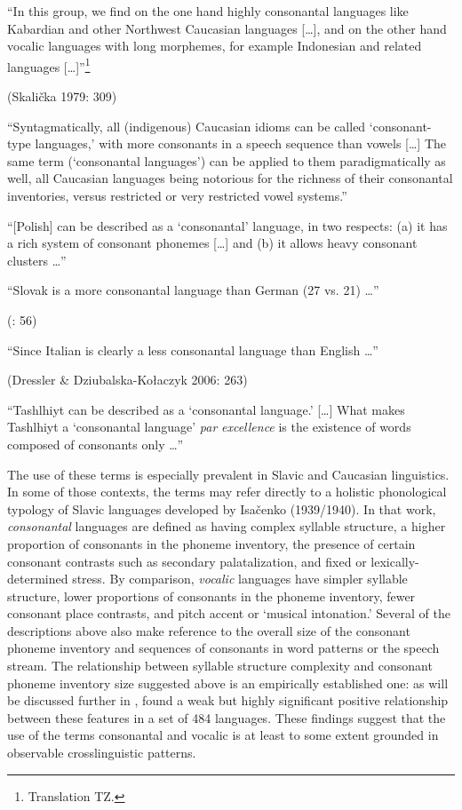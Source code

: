 \ea\label{ex:(1.13)}
   “In this group, we find on the one hand highly consonantal languages like Kabardian and other Northwest Caucasian languages […], and on the other hand vocalic languages with long morphemes, for example Indonesian and related languages […]”\footnote{ \textrm{Translation TZ.}}

(Skalička 1979: 309)
\z

\ea\label{ex:(1.14)}
   “Syntagmatically, all (indigenous) Caucasian idioms can be called ‘consonant-type languages,’ with more consonants in a speech sequence than vowels […] The same term (‘consonantal languages’) can be applied to them paradigmatically as well, all Caucasian languages being notorious for the richness of their consonantal inventories, versus restricted or very restricted vowel systems.” 

\citep[43]{Chirikba2008}
\z

\ea\label{ex:(1.15)}
  “[Polish] can be described as a ‘consonantal’ language, in two respects: (a) it has a rich system of consonant phonemes […] and (b) it allows heavy consonant clusters …” 

\citep[103]{Jassem2003}
\z

\ea\label{ex:(1.16)}
   “Slovak is a more consonantal language than German (27 vs. 21) …”

(\citealt{DresslerEtAl2015}: 56)
\z

\ea\label{ex:(1.17)}
  “Since Italian is clearly a less consonantal language than English …” 

(Dressler \& Dziubalska-Kołaczyk 2006: 263)
\z

\ea\label{ex:(1.18)}
  “Tashlhiyt can be described as a ‘consonantal language.’ […] What makes Tashlhiyt a ‘consonantal language’ \textit{par} \textit{excellence} is the existence of words composed of consonants only …” 
\z

\citep[216]{Ridouane2014}

  The use of these terms is especially prevalent in Slavic and Caucasian linguistics. In some of those contexts, the terms may refer directly to a holistic phonological typology of Slavic languages developed by Isačenko (1939/1940). In that work, \textit{consonantal} languages are defined as having complex syllable structure, a higher proportion of consonants in the phoneme inventory, the presence of certain consonant contrasts such as secondary palatalization, and fixed or lexically-determined stress. By comparison, \textit{vocalic} languages have simpler syllable structure, lower proportions of consonants in the phoneme inventory, fewer consonant place contrasts, and pitch accent or ‘musical intonation.’ Several of the descriptions above also make reference to the overall size of the consonant phoneme inventory and sequences of consonants in word patterns or the speech stream. The relationship between syllable structure complexity and consonant phoneme inventory size suggested above is an empirically established one: as will be discussed further in , \citet{Maddieson2013a} found a weak but highly significant positive relationship between these features in a set of 484 languages. These findings suggest that the use of the terms consonantal and vocalic is at least to some extent grounded in observable crosslinguistic patterns.


